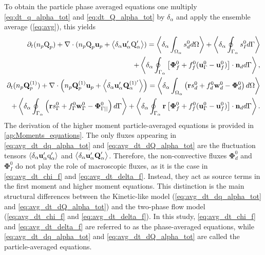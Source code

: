 To obtain the particle phase averaged equations one multiply \ref{eq:dt_q_alpha_tot} and \ref{eq:dt_Q_alpha_tot} by $\delta_\alpha$ and apply the ensemble average (\ref{eq:avg}), this yields
\begin{align}
    \partial_t (n_p\text Q_p)
    + \mathbf{\nabla}\cdot (n_p \text Q_p \textbf{u}_p + \left<\delta_\alpha \textbf{u}_\alpha' \text Q_\alpha'\right>)
    = \left<\delta_\alpha \int_{\Omega_{\alpha}}  s_d^0  d\Omega\right>
    + \left<\delta_\alpha \oint_{\Gamma_{\alpha}}  s_I^0  d\Gamma\right>\nonumber\\
    + \left<\delta_\alpha \oint_{\Gamma_{\alpha}}  \left[\mathbf{\Phi}_f^0 + f_f^0 (\textbf{u}_\Gamma^0-\textbf{u}_f^0) \right] \cdot \textbf{n}_d  d\Gamma\right>,
    \label{eq:avg_dt_dq_alpha_tot}\\
    \partial_t (n_p\textbf{Q}_p^{(1)})
    + \mathbf{\nabla}\cdot \left(n_p \textbf{Q}_p^{(1)} \textbf{u}_p + \left<\delta_\alpha \textbf{u}_\alpha' \textbf{Q}_\alpha^{(1)'}\right>\right)
    =\left<\delta_\alpha \int_{\Omega_{\alpha}}  \left(
        \textbf{r} s_d^0         
        + f_d^0  \textbf{w}_d^0 
        - \mathbf{\Phi}_d^0
    \right)  d\Omega\right>\nonumber\\
    + \left<\delta_\alpha \oint_{\Gamma_{\alpha}}  \left(
        \textbf{r}s_\Gamma^0
        + f_\Gamma^0 \textbf{w}_\Gamma^0
        - \mathbf{\Phi}_{\Gamma||}^0
    \right)  d\Gamma\right>
    + \left<\delta_\alpha \oint_{\Gamma_{\alpha}}  \textbf{r} \left[
        \mathbf{\Phi}_f^0
        + f_f^0 (\textbf{u}_\Gamma^0-\textbf{u}_f^0)
    \right]\cdot \textbf{n}_d   d\Gamma\right>.
    \label{eq:avg_dt_dQ_alpha_tot}
\end{align}
The derivation of the higher moment particle-averaged equations is provided in \ref{ap:Moments_equations}.
The only fluxes appearing in \ref{eq:avg_dt_dq_alpha_tot} and \ref{eq:avg_dt_dQ_alpha_tot} are the fluctuation tensors $\left<\delta_\alpha \textbf{u}_\alpha' \text q_\alpha'\right>$ and $\left<\delta_\alpha \textbf{u}_\alpha' \textbf{Q}_\alpha'\right>$. 
Therefore, the non-convective fluxes $\bm\Phi_d^0$ and $\bm\Phi_I^0$ do not play the role of macroscopic fluxes, as it is the case in \ref{eq:avg_dt_chi_f} and \ref{eq:avg_dt_delta_f}. Instead, they act as source terms in the first moment and higher moment equations. 
This distinction is the main structural differences between the Kinetic-like model (\ref{eq:avg_dt_dq_alpha_tot} and \ref{eq:avg_dt_dQ_alpha_tot}) and the two-phase flow model (\ref{eq:avg_dt_chi_f} and \ref{eq:avg_dt_delta_f}). 
In this study, \ref{eq:avg_dt_chi_f} and \ref{eq:avg_dt_delta_f} are referred to as the phase-averaged equations, while \ref{eq:avg_dt_dq_alpha_tot} and \ref{eq:avg_dt_dQ_alpha_tot} are called the particle-averaged equations. 


 



